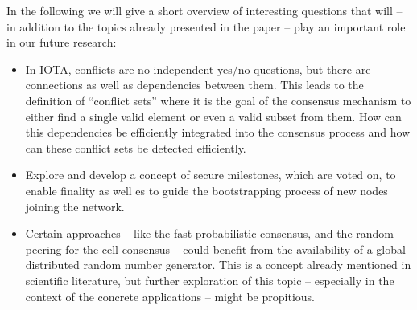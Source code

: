 \documentclass[../main.tex]{subfiles}
\begin{document}
In the following we will give a short overview of interesting questions that will -- in addition to the topics already presented in the paper -- play an important role in our future research:

\begin{itemize}
    \item In IOTA, conflicts are no independent yes/no questions, but there are connections as well as dependencies between them. This leads to the definition of \enquote{conflict sets} where it is the goal of the consensus mechanism to either find a single valid element or even a valid subset from them.
    How can this dependencies be efficiently integrated into the consensus process and how can these conflict sets be detected efficiently.
    
    \item Explore and develop a concept of secure milestones, which are voted on, to enable finality as well es to guide the bootstrapping process of new nodes joining the network.
    
    \item Certain approaches -- like the fast probabilistic consensus, and the random peering for the cell consensus -- could benefit from the availability of a global distributed random number generator.
    This is a concept already mentioned in scientific literature, but further exploration of this topic -- especially in the context of the concrete applications -- might be propitious. 
    
\end{itemize}
\end{document}
